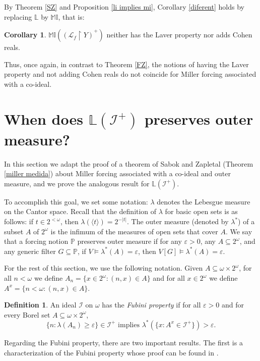 \documentclass{amsart}
\theoremstyle{definition}
\newtheorem{definition}[theorem]{Definition}
\newtheorem{coro}[theorem]{Corollary}
\theoremstyle{remark}
\numberwithin{equation}{section}
\newcommand{\p}{\mathbb{P}}
\newcommand{\lf}{\mathcal{L}_f}
\newcommand{\li}{\mathbb{L}(\mathcal{I}^+)}
\newcommand{\lav}{\mathbb{L}}
\newcommand{\mil}{\mathbb{MI}}
\newcommand{\id}{\mathcal{I}}
\begin{document}
By Theorem \ref{SZ} and Proposition \ref{li implies mi}, Corollary \ref{diferent} holds by replacing $\lav$ by $\mil$, that is:

\begin{coro}
    $\mil((\lf\upharpoonright Y)^+)$ neither has the Laver property nor adds Cohen reals.
\end{coro}

Thus, once again, in contrast to Theorem \ref{FZ}, the notions of having the Laver property and not adding Cohen reals do not coincide for Miller forcing associated with a co-ideal.

\section{When does $\li$ preserves outer measure?}

In this section we adapt the proof of a theorem of Sabok and Zapletal (Theorem \ref{miller medida}) about Miller forcing associated with a co-ideal and outer measure, and we prove the analogous result for $\li$.

To accomplish this goal, we set some notation: $\lambda$ denotes the Lebesgue measure on the Cantor space. Recall that the definition of $\lambda$ for basic open sets is as follows: if $t\in2^{<\omega}$, then $\lambda(\langle t \rangle)=2^{-|t|}$. The outer measure (denoted by $\lambda^*$) of a subset $A$ of $2^{\omega}$ is the infimum of the measures of open sets that cover $A$. We say that a forcing notion $\p$ preserves outer measure if for any $\varepsilon>0$, any $A \subseteq 2^\omega$, and any generic filter $G\subseteq \p$, if $V\models \lambda^*(A)=\varepsilon$, then $V[G]\models \lambda^*(A)=\varepsilon$.

For the rest of this section, we use the following notation. Given $A\subseteq \omega\times 2^\omega$, for all $n< \omega$ we define $A_n=\{x\in2^\omega:(n,x)\in A\}$ and for all $x\in 2^\omega$ we define $A^x=\{n<\omega: (n,x)\in A\}$.

\begin{definition}
An ideal $\id$ on $\omega$ has the \textit{Fubini property} if for all $\varepsilon>0$ and for every Borel set $A\subseteq \omega\times 2^\omega$, 
\[
\{n: \lambda(A_n)\geq\varepsilon\}\in \id^+ \text{ implies } \lambda^*(\{x: A^x\in \id^+\})>\varepsilon.
\]
\end{definition}

Regarding the Fubini property, there are two important results. The first is a characterization of the Fubini property whose proof can be found in \cite{meza}.
\end{document}
